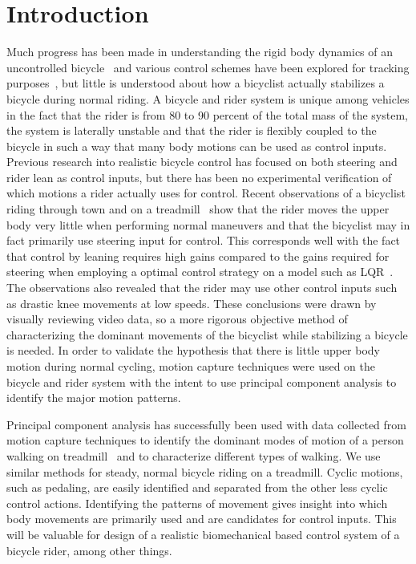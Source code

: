 \section{Introduction}
\label{intro}
Much progress has been made in understanding the rigid body dynamics of an
uncontrolled bicycle~\cite{Meijaard2007} and various control schemes have been
explored for tracking purposes~\cite{Peterson2008a,Schwab2008,Sharp2008a}, but
little is understood about how a bicyclist actually stabilizes a bicycle during
normal riding. A bicycle and rider system is unique among vehicles in the fact
that the rider is from 80 to 90 percent of the total mass of the system, the
system is laterally unstable and that the rider is flexibly coupled to the
bicycle in such a way that many body motions can be used as control inputs.
Previous research into realistic bicycle control has focused on both steering
and rider lean as control inputs, but there has been no experimental
verification of which motions a rider actually uses for control. Recent
observations of a bicyclist riding through town and on a
treadmill~\cite{Kooijman2009a} show that the rider moves the upper body very
little when performing normal maneuvers and that the bicyclist may in fact
primarily use steering input for control. This corresponds well with the fact
that control by leaning requires high gains compared to the gains required for
steering when employing a optimal control strategy on a model such as
LQR~\cite{Peterson2008a,Schwab2008,Sharp2008a}. The observations also revealed
that the rider may use other control inputs such as drastic knee movements at
low speeds. These conclusions were drawn by visually reviewing video data, so a
more rigorous objective method of characterizing the dominant movements of the
bicyclist while stabilizing a bicycle is needed. In order to validate the
hypothesis that there is little upper body motion during normal cycling, motion
capture techniques were used on the bicycle and rider system with the intent to
use principal component analysis to identify the major motion patterns.

Principal component analysis has successfully been used with data collected
from motion capture techniques to identify the dominant modes of motion of a
person walking on treadmill~\cite{Troje2002} and to characterize different
types of walking. We use similar methods for steady, normal bicycle riding on a
treadmill. Cyclic motions, such as pedaling, are easily identified and
separated from the other less cyclic control actions. Identifying the patterns
of movement gives insight into which body movements are primarily used and are
candidates for control inputs. This will be valuable for design of a realistic
biomechanical based control system of a bicycle rider, among other things.
